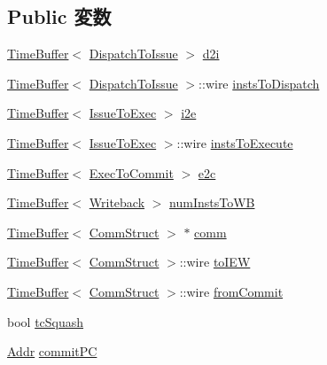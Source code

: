 \subsection*{Public 変数}
\begin{DoxyCompactItemize}
\item 
\hyperlink{classTimeBuffer}{TimeBuffer}$<$ \hyperlink{structBackEnd_1_1SizeStruct}{DispatchToIssue} $>$ \hyperlink{classBackEnd_ae446eaddd47d5f227ed00af24aaefe68}{d2i}
\item 
\hyperlink{classTimeBuffer}{TimeBuffer}$<$ \hyperlink{structBackEnd_1_1SizeStruct}{DispatchToIssue} $>$::wire \hyperlink{classBackEnd_ace1cd34be1eca99cb8c1d3a30e32fcbe}{instsToDispatch}
\item 
\hyperlink{classTimeBuffer}{TimeBuffer}$<$ \hyperlink{structBackEnd_1_1SizeStruct}{IssueToExec} $>$ \hyperlink{classBackEnd_a055203b013ada25d70a2a2c8b2364455}{i2e}
\item 
\hyperlink{classTimeBuffer}{TimeBuffer}$<$ \hyperlink{structBackEnd_1_1SizeStruct}{IssueToExec} $>$::wire \hyperlink{classBackEnd_a45c3ddf2275eab2326190578f1fcbee2}{instsToExecute}
\item 
\hyperlink{classTimeBuffer}{TimeBuffer}$<$ \hyperlink{structBackEnd_1_1SizeStruct}{ExecToCommit} $>$ \hyperlink{classBackEnd_a114248f83077c8e99f4f4aa0236aafeb}{e2c}
\item 
\hyperlink{classTimeBuffer}{TimeBuffer}$<$ \hyperlink{structBackEnd_1_1SizeStruct}{Writeback} $>$ \hyperlink{classBackEnd_a2647e2052851a9122ac4ce89b84d77b5}{numInstsToWB}
\item 
\hyperlink{classTimeBuffer}{TimeBuffer}$<$ \hyperlink{classBackEnd_a82fb3c7183ba777a05c510ab2fbcfb82}{CommStruct} $>$ $\ast$ \hyperlink{classBackEnd_a282f2307a986f183b83e887756561687}{comm}
\item 
\hyperlink{classTimeBuffer}{TimeBuffer}$<$ \hyperlink{classBackEnd_a82fb3c7183ba777a05c510ab2fbcfb82}{CommStruct} $>$::wire \hyperlink{classBackEnd_acf56450a952ce19a7cc68c86f0334c0c}{toIEW}
\item 
\hyperlink{classTimeBuffer}{TimeBuffer}$<$ \hyperlink{classBackEnd_a82fb3c7183ba777a05c510ab2fbcfb82}{CommStruct} $>$::wire \hyperlink{classBackEnd_a77bf6c956edddf1d551d5371ff72162e}{fromCommit}
\item 
bool \hyperlink{classBackEnd_ae3369c2288f4867553aaca811229bd3c}{tcSquash}
\item 
\hyperlink{base_2types_8hh_af1bb03d6a4ee096394a6749f0a169232}{Addr} \hyperlink{classBackEnd_af043d6103c5f173871f527899c41d2d2}{commitPC}
\item 

\end{DoxyCompactItemize}
